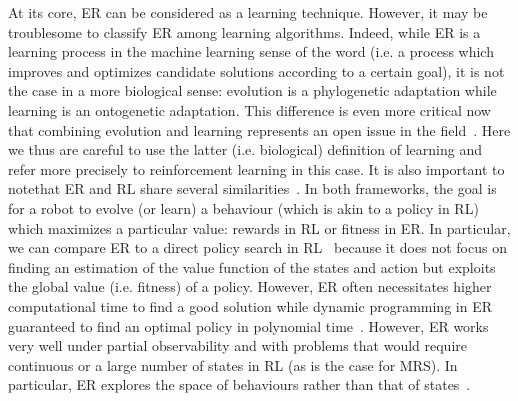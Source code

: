     At its core, ER can be considered as a learning technique. However, it may be troublesome to classify ER among learning algorithms. Indeed, while ER is a learning process in the machine learning sense of the word (i.e. a process which improves and optimizes candidate solutions according to a certain goal), it is not the case in a more biological sense: evolution is a phylogenetic adaptation while learning is an ontogenetic adaptation. This difference is even more critical now that combining evolution and learning represents an open issue in the field~\parencite{Urzelai2001, Mouret2014, Doncieux2015a}. Here we thus are careful to use the latter (i.e. biological) definition of learning and refer more precisely to reinforcement learning in this case. It is also important to notethat ER and RL share several similarities~\parencite{Whiteson2012, Doncieux2015a}. In both frameworks, the goal is for a robot to evolve (or learn) a behaviour (which is akin to a policy in RL) which maximizes a particular value: rewards in RL or fitness in ER. In particular, we can compare ER to a direct policy search in RL~\parencite{Kober2013} because it does not focus on finding an estimation of the value function of the states and action but exploits the global value (i.e. fitness) of a policy. However, ER often necessitates higher computational time to find a good solution while dynamic programming in ER guaranteed to find an optimal policy in polynomial time~\parencite{Littman1994, Whiteson2012}. However, ER works very well under partial observability and with problems that would require continuous or a large number of states in RL (as is the case for MRS). In particular, ER explores the space of behaviours rather than that of states~\parencite{Panait2005}.


